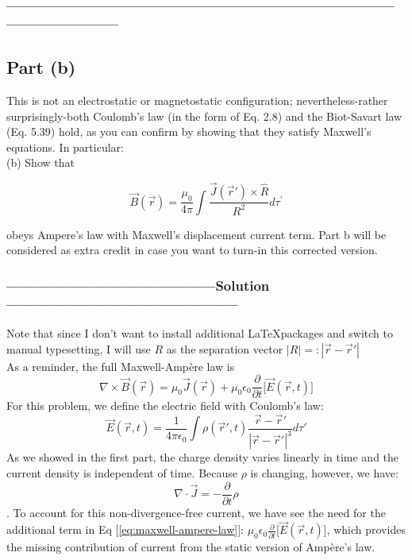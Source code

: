 \documentclass[a4paper,12pt]{article} %
\begin{document}
\subsubsection*{-----------------------------------------------------------------------------------------------------}
\subsection*{Part (b)}
This is not an electrostatic or magnetostatic configuration; nevertheless-rather surprisingly-both Coulomb's law (in the form of Eq. 2.8) and the Biot-Savart law (Eq. 5.39) hold, as you can confirm by showing that they satisfy Maxwell's equations. In particular:\\

(b) Show that

$$
\vec{B}(\vec{r})=\frac{\mu_0}{4 \pi} \int \frac{\vec{J}\left(\overrightarrow{r}'\right) \times \hat{R}}{R^2} d \tau^{\prime}
$$

obeys Ampere's law with Maxwell's displacement current term.
Part b will be considered as extra credit in case you want to turn-in this corrected version.

\subsubsection*{------------------------------------------Solution-----------------------------------------------}
Note that since I don't want to install additional \LaTeX  packages and switch to manual typesetting, I will use $R$ as the separation vector $|R| =: |\vec{r} - \overrightarrow{r}'| $\\

As a reminder, the full Maxwell-Ampère law is
\begin{equation}
\nabla \times \vec{B}(\vec{r}) = \mu_0\vec{J}(\vec{r}) + \mu_0\epsilon_0 \frac{\partial}{\partial t} \Big[\vec{E}(\vec{r}, t)\Big]
	\label{eq:maxwell-ampere-law}
\end{equation}
For this problem, we define the electric field with Coulomb's law:
\begin{equation}
\vec{E}(\vec{r}, t) = \frac{1}{4\pi\epsilon_0} \int \rho(\overrightarrow{r}', t)\frac{\vec{r} - \overrightarrow{r}'}{|\vec{r} - \overrightarrow{r}'|^3}d\tau'
	\label{eq:coulomb-law}
\end{equation}
As we showed in the first part, the charge density varies linearly in time and the current density is independent of time. Because $\rho$ is changing, however, we have:
$$ \nabla \cdot \vec{J} = -\frac{\partial}{\partial t} \rho $$.
To account for this non-divergence-free current, we have see the need for the additional term in Eq [\ref{eq:maxwell-ampere-law}]: $\mu_0\epsilon_0\frac{\partial}{\partial t} \Big[\vec{E}(\vec{r}, t)\Big]$, which provides the missing contribution of current from the static version of Ampère's law.\\
\end{document}
